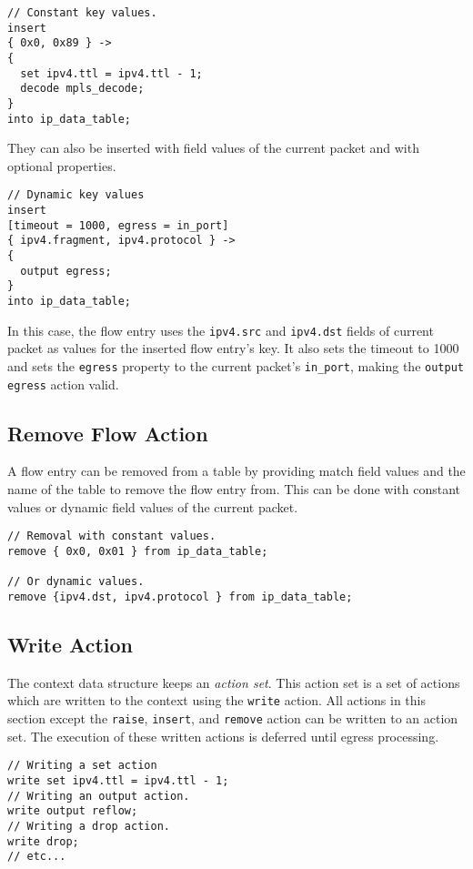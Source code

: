 \begin{lstlisting}
// Constant key values.
insert
{ 0x0, 0x89 } ->
{
  set ipv4.ttl = ipv4.ttl - 1;
  decode mpls_decode;
} 
into ip_data_table;
\end{lstlisting}

They can also be inserted with field values of the current packet and with optional properties.

\begin{lstlisting}
// Dynamic key values
insert
[timeout = 1000, egress = in_port]
{ ipv4.fragment, ipv4.protocol } ->
{
  output egress;
} 
into ip_data_table;
\end{lstlisting}

In this case, the flow entry uses the \texttt{ipv4.src} and \texttt{ipv4.dst} fields of current packet as values for the inserted flow entry's key. It also sets the timeout to 1000 and sets the \texttt{egress} property to the current packet's \texttt{in\_port}, making the \texttt{output egress} action valid.

\subsection{Remove Flow Action} \label{remove_flow_action_tut}

A flow entry can be removed from a table by providing match field values and the name of the table to remove the flow entry from. This can be done with constant values or dynamic field values of the current packet.

\begin{lstlisting}
// Removal with constant values.
remove { 0x0, 0x01 } from ip_data_table;

// Or dynamic values.
remove {ipv4.dst, ipv4.protocol } from ip_data_table;
\end{lstlisting}

\subsection{Write Action} \label{write_action_tut}

The context data structure keeps an \textit{action set}. This action set is a set of actions which are written to the context using the \texttt{write} action. All actions in this section except the \texttt{raise}, \texttt{insert}, and \texttt{remove} action can be written to an action set. The execution of these written actions is deferred until egress processing.

\begin{lstlisting}
// Writing a set action
write set ipv4.ttl = ipv4.ttl - 1;
// Writing an output action.
write output reflow;
// Writing a drop action.
write drop;
// etc...
\end{lstlisting}

